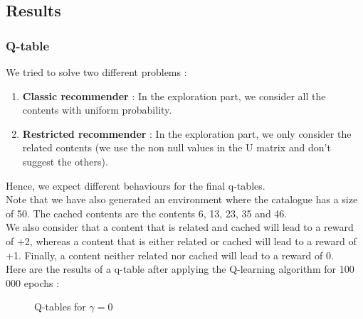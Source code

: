 \documentclass[a4paper]{article}
\begin{document}
\subsection{Results}

	\subsubsection{Q-table}
	
	We tried to solve two different problems : 
		\begin{enumerate}
			
			\item \textbf{Classic recommender} : In the exploration part, we consider all the contents with uniform probability.
			\item \textbf{Restricted recommender} : In the exploration part, we only consider the related contents (we use the non null values in the U matrix and don't suggest the others).
			
		\end{enumerate}
	Hence, we expect different behaviours for the final q-tables.  \\
	Note that we have also generated an environment where the catalogue has a size of 50. The cached contents are the contents 6, 13, 23, 35 and 46.\\
	We also consider that a content that is related and cached will lead to a reward of +2, whereas a content that is either related or cached will lead to a reward of +1. Finally, a content neither related nor cached will lead to a reward of 0. \\
	Here are the results of a q-table after applying the Q-learning algorithm for 100 000 epochs :
	\begin{figure}[h!]
    \centering
    \qquad
    \caption{Q-tables for $\gamma = 0$ }%
    \label{fig:example}%
    \end{figure}
	
\end{document}
